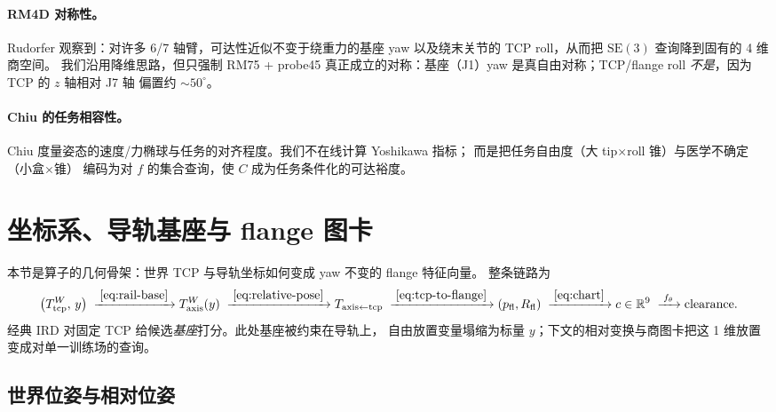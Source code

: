 \documentclass[UTF8,a4paper,11pt,fontset=fandol]{ctexart}
\newcommand{\SE}{\mathrm{SE}}
\newcommand{\R}{\mathbb{R}}
\newcommand{\Tcp}{T_{\mathrm{tcp}}}
\newcommand{\Taxis}{T_{\mathrm{axis}}}
\begin{document}
\paragraph{RM4D 对称性。}
Rudorfer 观察到：对许多 6/7 轴臂，可达性近似不变于绕重力的基座 yaw
以及绕末关节的 TCP roll，从而把 \(\SE(3)\) 查询降到固有的 4 维商空间。
我们沿用降维思路，但只强制 RM75 + probe45 真正成立的对称：基座（J1）yaw
是真自由对称；TCP/flange roll \emph{不是}，因为 TCP 的 \(z\) 轴相对 J7 轴
偏置约 \(\sim 50^{\circ}\)。

\paragraph{Chiu 的任务相容性。}
Chiu 度量姿态的速度/力椭球与任务的对齐程度。我们不在线计算 Yoshikawa 指标；
而是把任务自由度（大 tip$\times$roll 锥）与医学不确定（小盒$\times$锥）
编码为对 \(f\) 的集合查询，使 \(C\) 成为任务条件化的可达裕度。

\section{坐标系、导轨基座与 flange 图卡}
\label{sec:chart}

本节是算子的几何骨架：世界 TCP 与导轨坐标如何变成 yaw 不变的 flange 特征向量。
整条链路为
\begin{equation}
\label{eq:pipeline}
  \bigl(\Tcp^{W},\, y\bigr)
  \;\xrightarrow{\;\eqref{eq:rail-base}\;}
  \Taxis^{W}(y)
  \;\xrightarrow{\;\eqref{eq:relative-pose}\;}
  T_{\mathrm{axis\leftarrow tcp}}
  \;\xrightarrow{\;\eqref{eq:tcp-to-flange}\;}
  (p_{\mathrm{fl}},R_{\mathrm{fl}})
  \;\xrightarrow{\;\eqref{eq:chart}\;}
  c\in\R^{9}
  \;\xrightarrow{\;f_{\theta}\;}
  \text{clearance}.
\end{equation}
经典 IRD 对固定 TCP 给候选\emph{基座}打分。此处基座被约束在导轨上，
自由放置变量塌缩为标量 \(y\)；下文的相对变换与商图卡把这 1 维放置
变成对单一训练场的查询。

\subsection{世界位姿与相对位姿}
\label{sec:frames}
\end{document}
